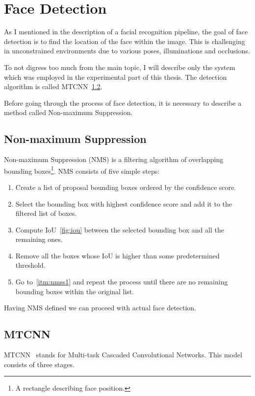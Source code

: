 \section{Face Detection}\label{sec:face-detection}
As I mentioned in the description of a facial recognition pipeline, the goal of face detection is to find the location
of the face within the image.
This is challenging in unconstrained environments due to various poses, illuminations and occlusions.

To not digress too much from the main topic, I will describe only the system which was employed in the experimental
part of this thesis.
The detection algorithm is called MTCNN~\ref{subsec:mtcnn}.

Before going through the process of face detection, it is necessary to describe a method called Non-maximum Suppression.

\subsection{Non-maximum Suppression}\label{subsec:nms}
Non-maximum Suppression (NMS) is a filtering algorithm of overlapping bounding
boxes\footnote{\label{foot:bbox}A rectangle describing face position.}.
NMS consists of five simple steps:
\begin{enumerate}
    \item \label{itm:nmss1}Create a list of proposal bounding boxes ordered by the confidence score.
    \item Select the bounding box with highest confidence score and add it to the filtered list of boxes.
    \item Compute IoU~\ref{fig:iou} between the selected bounding box and all the remaining ones.
    \item Remove all the boxes whose IoU is higher than some predetermined threshold.
    \item Go to~\ref{itm:nmss1} and repeat the process until there are no remaining bounding boxes within the original list.
\end{enumerate}

Having NMS defined we can proceed with actual face detection.

\subsection{MTCNN}\label{subsec:mtcnn}
MTCNN~\cite{MTCNN} stands for Multi-task Cascaded Convolutional Networks.
This model consists of three stages.

